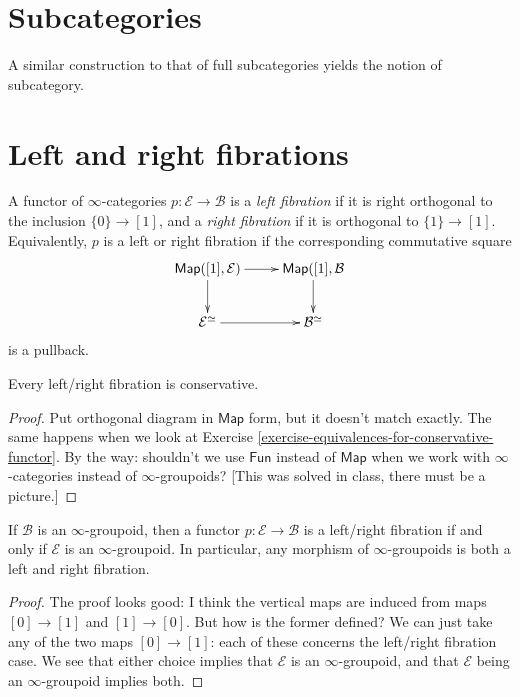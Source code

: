 \section{Subcategories}
\label{section-subcategories}

\noindent
A similar construction to that of full subcategories
yields the notion of subcategory.

\section{Left and right fibrations}
\label{section-left-and-right-fibrations}

\begin{definition}
\label{definition-left-right-fibrations}
A functor of $\infty$-categories $p:\mathcal{E} \to \mathcal{B}$
is a {\it left fibration} if it is right orthogonal to the
inclusion $\{0\}\to [1]$, and a {\it right fibration} 
if it is orthogonal to $\{1\}\to [1]$.
Equivalently, $p$ is a left or right fibration if
the corresponding commutative square
$$
\xymatrix{
\mathsf{Map}([1],\mathcal{E})\ar[r]\ar[d]&\mathsf{Map}([1],\mathcal{B}\ar[d]\\
\mathcal{E}^\simeq\ar[r]&\mathcal{B}^\simeq
}
$$
is a pullback.
\end{definition}

\begin{exercise}
\label{exercise-3.1}
Every left/right fibration is conservative.
\end{exercise}

\begin{proof}
Put orthogonal diagram in $\mathsf{Map}$ form,
but it doesn't match exactly.
The same happens when we look at
Exercise \ref{exercise-equivalences-for-conservative-functor}.
By the way: shouldn't we use $\mathsf{Fun}$ instead of $\mathsf{Map}$ 
when we work with $\infty$-categories instead of $\infty$-groupoids?
[This was solved in class, there must be a picture.]
\end{proof}

\begin{lemma}
\label{lemma-fibrations-etale-space-is-groupoid}
If $\mathcal{B}$ is an $\infty$-groupoid,
then a functor $p:\mathcal{E} \to \mathcal{B}$
is a left/right fibration if and only if $\mathcal{E}$ 
is an $\infty$-groupoid. In particular,
any morphism of $\infty$-groupoids
is both a left and right fibration.
\end{lemma}

\begin{proof}
The proof looks good: I think the vertical maps
are induced from maps $[0] \to [1]$ and $[1] \to [0]$.
But how is the former defined? We can just take
any of the two maps $[0]\to[1]$:
each of these concerns the left/right fibration case.
We see that either choice implies that $\mathcal{E}$ is
an $\infty$-groupoid, and that $\mathcal{E}$ being an
$\infty$-groupoid implies both.
\end{proof}

